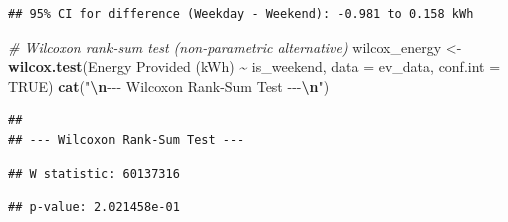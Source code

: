 \documentclass[
  12pt,
]{article}
\newenvironment{Shaded}{\begin{snugshade}}{\end{snugshade}}
\newcommand{\AttributeTok}[1]{\textcolor[rgb]{0.13,0.29,0.53}{#1}}
\newcommand{\CommentTok}[1]{\textcolor[rgb]{0.56,0.35,0.01}{\textit{#1}}}
\newcommand{\ConstantTok}[1]{\textcolor[rgb]{0.56,0.35,0.01}{#1}}
\newcommand{\FunctionTok}[1]{\textcolor[rgb]{0.13,0.29,0.53}{\textbf{#1}}}
\newcommand{\NormalTok}[1]{#1}
\newcommand{\OtherTok}[1]{\textcolor[rgb]{0.56,0.35,0.01}{#1}}
\newcommand{\SpecialCharTok}[1]{\textcolor[rgb]{0.81,0.36,0.00}{\textbf{#1}}}
\newcommand{\StringTok}[1]{\textcolor[rgb]{0.31,0.60,0.02}{#1}}
\begin{document}
\begin{verbatim}
## 95% CI for difference (Weekday - Weekend): -0.981 to 0.158 kWh
\end{verbatim}

\begin{Shaded}
\begin{Highlighting}[]
\CommentTok{\# Wilcoxon rank{-}sum test (non{-}parametric alternative)}
\NormalTok{wilcox\_energy }\OtherTok{\textless{}{-}} \FunctionTok{wilcox.test}\NormalTok{(}\StringTok{\textasciigrave{}}\AttributeTok{Energy Provided (kWh)}\StringTok{\textasciigrave{}} \SpecialCharTok{\textasciitilde{}}\NormalTok{ is\_weekend,}
    \AttributeTok{data =}\NormalTok{ ev\_data, }\AttributeTok{conf.int =} \ConstantTok{TRUE}\NormalTok{)}
\FunctionTok{cat}\NormalTok{(}\StringTok{"}\SpecialCharTok{\textbackslash{}n}\StringTok{{-}{-}{-} Wilcoxon Rank{-}Sum Test {-}{-}{-}}\SpecialCharTok{\textbackslash{}n}\StringTok{"}\NormalTok{)}
\end{Highlighting}
\end{Shaded}

\begin{verbatim}
## 
## --- Wilcoxon Rank-Sum Test ---
\end{verbatim}

\begin{Shaded}
\end{Shaded}

\begin{verbatim}
## W statistic: 60137316
\end{verbatim}

\begin{Shaded}
\end{Shaded}

\begin{verbatim}
## p-value: 2.021458e-01
\end{verbatim}
\end{document}

